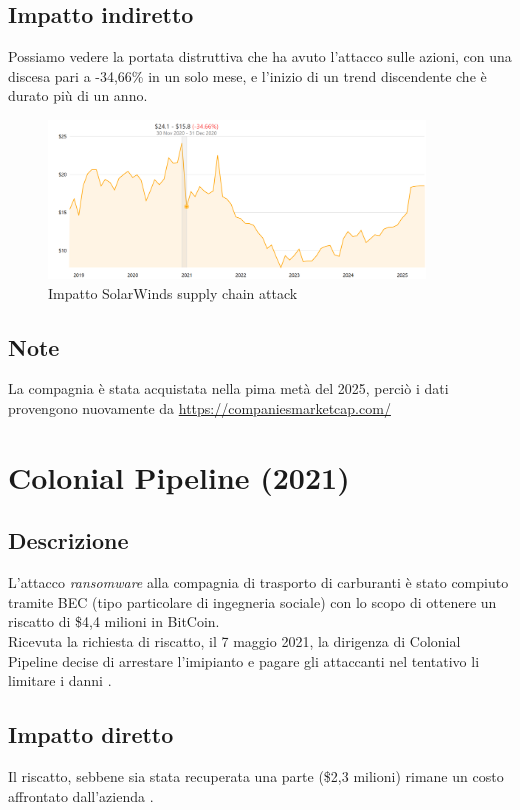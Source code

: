 \documentclass[12pt,a4paper,openright,twoside]{report}
\begin{document}
\subsection{Impatto indiretto}
Possiamo vedere la portata distruttiva che ha avuto l'attacco sulle azioni, con una discesa pari a -34,66\% in un solo mese, e l'inizio di un trend discendente che \`e durato pi\`u di un anno.\\
\begin{figure}[H] 
\begin{center} 
\includegraphics[width=10cm]{figures/solarwinds.png} 
\caption[Grafico SolarWinds]{Impatto SolarWinds supply chain attack}\label{fig:slrw}
\end{center}
\end{figure}
\subsection{Note}
La compagnia \`e stata acquistata nella pima met\`a del 2025, perci\`o i dati provengono nuovamente da \href{https://companiesmarketcap.com/solarwinds/stock-price-history}{https://companiesmarketcap.com/}\\

\section{Colonial Pipeline (2021)}
\subsection{Descrizione}
L'attacco \textit{ransomware} alla compagnia di trasporto di carburanti \`e stato compiuto tramite BEC (tipo particolare di ingegneria sociale) con lo scopo di ottenere un riscatto di \$4,4 milioni in BitCoin.\\
Ricevuta la richiesta di riscatto, il 7 maggio 2021, la dirigenza di Colonial Pipeline decise di arrestare l'imipianto e pagare gli attaccanti nel tentativo li limitare i danni \cite{ColonialPipe_IEEE}.
\subsection{Impatto diretto}
Il riscatto, sebbene sia stata recuperata una parte (\$2,3 milioni) rimane un costo affrontato dall'azienda \cite{ColonialPipe_IEEE}.\\
\end{document}
